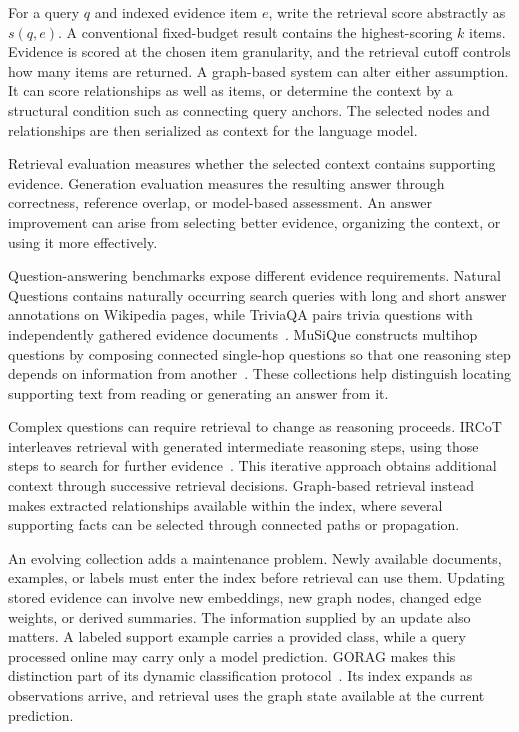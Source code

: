 For a query $q$ and indexed evidence item $e$, write the retrieval score abstractly as $s(q,e)$. A conventional fixed-budget result contains the highest-scoring $k$ items. Evidence is scored at the chosen item granularity, and the retrieval cutoff controls how many items are returned. A graph-based system can alter either assumption. It can score relationships as well as items, or determine the context by a structural condition such as connecting query anchors. The selected nodes and relationships are then serialized as context for the language model.

Retrieval evaluation measures whether the selected context contains supporting evidence. Generation evaluation measures the resulting answer through correctness, reference overlap, or model-based assessment. An answer improvement can arise from selecting better evidence, organizing the context, or using it more effectively.

Question-answering benchmarks expose different evidence requirements. Natural Questions contains naturally occurring search queries with long and short answer annotations on Wikipedia pages, while TriviaQA pairs trivia questions with independently gathered evidence documents~\cite{lit-kwiatkowski2019natural,lit-joshi2017triviaqa}. MuSiQue constructs multihop questions by composing connected single-hop questions so that one reasoning step depends on information from another~\cite{lit-trivedi2022musique}. These collections help distinguish locating supporting text from reading or generating an answer from it.

Complex questions can require retrieval to change as reasoning proceeds. IRCoT interleaves retrieval with generated intermediate reasoning steps, using those steps to search for further evidence~\cite{lit-trivedi2022interleaving}. This iterative approach obtains additional context through successive retrieval decisions. Graph-based retrieval instead makes extracted relationships available within the index, where several supporting facts can be selected through connected paths or propagation.

An evolving collection adds a maintenance problem. Newly available documents, examples, or labels must enter the index before retrieval can use them. Updating stored evidence can involve new embeddings, new graph nodes, changed edge weights, or derived summaries. The information supplied by an update also matters. A labeled support example carries a provided class, while a query processed online may carry only a model prediction. GORAG makes this distinction part of its dynamic classification protocol~\cite{bg-gorag}. Its index expands as observations arrive, and retrieval uses the graph state available at the current prediction.

